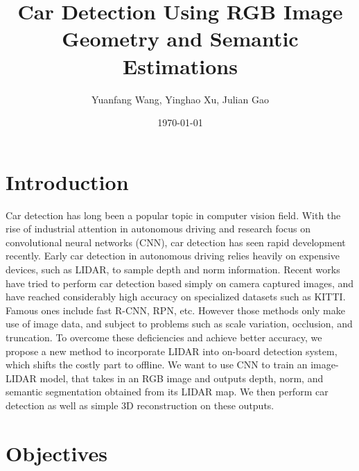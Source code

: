 \documentclass[dvips,12pt]{article}
\begin{document}
\title{Car Detection Using RGB Image Geometry and Semantic Estimations}
\author{Yuanfang Wang, Yinghao Xu, Julian Gao}
\date{\today}
\maketitle

\section{Introduction}
%
%
Car detection has long been a popular topic in computer vision field. With the rise of industrial attention in autonomous driving and research focus on convolutional neural networks (CNN), car detection has seen rapid development recently. Early car detection in autonomous driving relies heavily on expensive devices, such as LIDAR, to sample depth and norm information. Recent works have tried to perform car detection based simply on camera captured images, and have reached considerably high accuracy on specialized datasets such as KITTI. Famous ones include fast R-CNN\cite{}, RPN\cite{}, etc. However those methods only make use of image data, and subject to problems such as scale variation, occlusion, and truncation\cite{}. To overcome these deficiencies and achieve better accuracy, we propose a new method to incorporate LIDAR into on-board detection system, which shifts the costly part to offline. We want to use CNN to train an image-LIDAR model, that takes in an RGB image and outputs depth, norm, and semantic segmentation obtained from its LIDAR map. We then perform car detection as well as simple 3D reconstruction on these outputs.

\section{Objectives}
\end{document}
